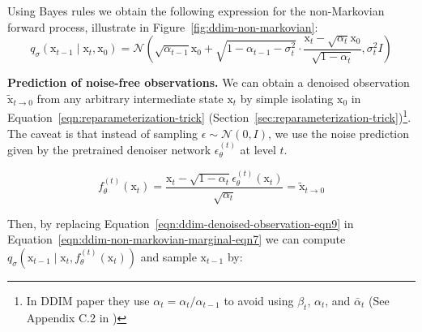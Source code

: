 
\noindent Using Bayes rules we obtain the following expression for the non-Markovian forward process, illustrate in Figure~\ref{fig:ddim-non-markovian}:
\begin{equation}\label{eqn:ddim-non-markovian-marginal-eqn7}
    q_{\sigma}(\mathrm{x}_{t-1}\mid\mathrm{x}_{t}, \mathrm{x}_{0}) = \mathcal{N}(\sqrt{\alpha_{t-1}} \mathrm{x}_0 + \sqrt{1 - \alpha_{t-1} - \sigma_{t}^{2}}\cdot\frac{\mathrm{x}_{t} - \sqrt{\alpha_{t}}\mathrm{x}_{0}}{\sqrt{1-\alpha_{t}}}, \sigma_{t}^{2}I)
\end{equation}


\noindent \textbf{Prediction of noise-free observations.} We can obtain 
a denoised observation $\tilde{\mathrm{x}}_{t\rightarrow 0}$ from any arbitrary
intermediate state $\mathrm{x}_{t}$ by simple isolating $\mathrm{x}_{0}$ in Equation~\ref{eqn:reparameterization-trick} (Section~\ref{sec:reparameterization-trick})\footnote{In DDIM paper they use $\alpha_{t}=\alpha_{t} / \alpha_{t-1}$ to avoid using $\beta_{t}$, $\alpha_{t}$, and $\bar{\alpha}_{t}$ (See Appendix C.2 in \cite{song2020denoising})}. The caveat is that instead of sampling
 $\epsilon\sim\mathcal{N}(0, I)$,  we use the noise prediction given by the pretrained denoiser network $\epsilon_{\theta}^{(t)}$ at level $t$.

\begin{equation}\label{eqn:ddim-denoised-observation-eqn9}
    f_{\theta}^{(t)}(\mathrm{x}_{t}) = \frac{\mathrm{x}_{t} - \sqrt{1-\alpha_{t}}\epsilon_{\theta}^{(t)}(\mathrm{x}_{t})}{\sqrt{\alpha_{t}}} = \tilde{\mathrm{x}}_{t\rightarrow 0} 
\end{equation}

\noindent Then, by replacing Equation~\ref{eqn:ddim-denoised-observation-eqn9} in Equation~\ref{eqn:ddim-non-markovian-marginal-eqn7} we can compute $q_{\sigma}(\mathrm{x}_{t-1}\mid\mathrm{x}_{t}, f_{\theta}^{(t)}(\mathrm{x}_{t}))$ and sample $\mathrm{x}_{t-1}$ by:

